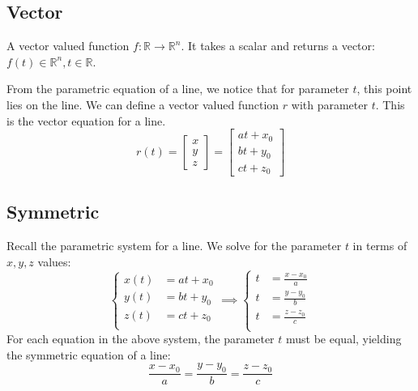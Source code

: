 \documentclass{article}
\begin{document}
\subsection{Vector}

A vector valued function $f:\mathbb R\to \mathbb R^n$. It takes a scalar and returns a vector: $f(t)\in\mathbb R^n, t\in\mathbb R$.

From the parametric equation of a line, we notice that for parameter $t$, this point lies on the line. We can define a vector valued function $r$ with parameter $t$. This is the vector equation for a line.
\begin{equation*}
    r(t)
	=\begin{bmatrix}
		x \\ y \\ z
    \end{bmatrix}
	=\begin{bmatrix}
		at+x_0 \\
		bt+y_0 \\
		ct+z_0
	\end{bmatrix}
\end{equation*}

\subsection{Symmetric}

Recall the parametric system for a line. We solve for the parameter $t$ in terms of $x,y,z$ values:
\begin{equation*}
	\left\{\begin{aligned}
		x(t)&=at+x_0 \\
		y(t)&=bt+y_0 \\
		z(t)&=ct+z_0 \\
	\end{aligned}\right.
	\implies
	\left\{\begin{aligned}
		t&=\frac{x-x_0}{a} \\
		t&=\frac{y-y_0}{b} \\
		t&=\frac{z-z_0}{c} \\
	\end{aligned}\right.
\end{equation*}
For each equation in the above system, the parameter $t$ must be equal, yielding the symmetric equation of a line:
\begin{equation*}
    \frac{x-x_0}{a}=\frac{y-y_0}{b}=\frac{z-z_0}{c}
\end{equation*}
\end{document}
